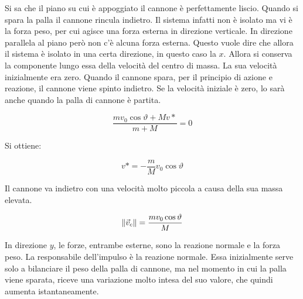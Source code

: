 \begin{figure}[htpb]
\end{figure}
\FloatBarrier
Si sa che il piano su cui è appoggiato il cannone è perfettamente liscio. Quando si spara la palla il cannone rincula indietro. Il sistema infatti non è isolato ma vi è la forza peso, per cui agisce una forza esterna in direzione verticale. In direzione parallela al piano però non c'è alcuna forza esterna. Questo vuole dire che allora il sistema è isolato in una certa direzione, in questo caso la $x$. Allora si conserva la componente lungo essa della velocità del centro di massa. La sua velocità inizialmente era zero. Quando il cannone spara, per il principio di azione e reazione, il cannone viene spinto indietro. Se la velocità iniziale è zero, lo sarà anche quando la palla di cannone è partita.

\[
	\frac{mv_0 \cos\vartheta+ Mv*}{m+M} =0
\]

Si ottiene:

\[
	v*=-\frac{m}{M}v_0\cos\vartheta
\]

Il cannone va indietro con una velocità molto piccola a causa della sua massa elevata.

\[
	\lVert\vec{v}_c\rVert=\frac{mv_0\cos\vartheta}{M}
\]

In direzione $y$, le forze, entrambe esterne, sono la reazione normale e la forza peso. La responsabile dell'impulso è la reazione normale. Essa inizialmente serve solo a bilanciare il peso della palla di cannone, ma nel momento in cui la palla viene sparata, riceve una variazione molto intesa del suo valore, che quindi aumenta istantaneamente.

